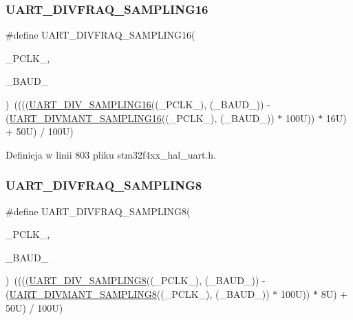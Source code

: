 \subsubsection{\texorpdfstring{U\+A\+R\+T\+\_\+\+D\+I\+V\+F\+R\+A\+Q\+\_\+\+S\+A\+M\+P\+L\+I\+N\+G16}{UART\_DIVFRAQ\_SAMPLING16}}
{\footnotesize\ttfamily \#define U\+A\+R\+T\+\_\+\+D\+I\+V\+F\+R\+A\+Q\+\_\+\+S\+A\+M\+P\+L\+I\+N\+G16(\begin{DoxyParamCaption}\item[{}]{\+\_\+\+P\+C\+L\+K\+\_\+,  }\item[{}]{\+\_\+\+B\+A\+U\+D\+\_\+ }\end{DoxyParamCaption})~((((\hyperlink{group___u_a_r_t___private___macros_gabd6dd99fff6cd5c0374780fd72a61e6e}{U\+A\+R\+T\+\_\+\+D\+I\+V\+\_\+\+S\+A\+M\+P\+L\+I\+N\+G16}((\+\_\+\+P\+C\+L\+K\+\_\+), (\+\_\+\+B\+A\+U\+D\+\_\+)) -\/ (\hyperlink{group___u_a_r_t___private___macros_ga9cd479aff25c454d9d4f3c1c20517c86}{U\+A\+R\+T\+\_\+\+D\+I\+V\+M\+A\+N\+T\+\_\+\+S\+A\+M\+P\+L\+I\+N\+G16}((\+\_\+\+P\+C\+L\+K\+\_\+), (\+\_\+\+B\+A\+U\+D\+\_\+)) $\ast$ 100\+U)) $\ast$ 16\+U) + 50\+U) / 100\+U)}



Definicja w linii 803 pliku stm32f4xx\+\_\+hal\+\_\+uart.\+h.

\mbox{\label{group___u_a_r_t___private___macros_gae0c8a28dbc006a93dd8e90e8ff8a37a0}} 
\subsubsection{\texorpdfstring{U\+A\+R\+T\+\_\+\+D\+I\+V\+F\+R\+A\+Q\+\_\+\+S\+A\+M\+P\+L\+I\+N\+G8}{UART\_DIVFRAQ\_SAMPLING8}}
{\footnotesize\ttfamily \#define U\+A\+R\+T\+\_\+\+D\+I\+V\+F\+R\+A\+Q\+\_\+\+S\+A\+M\+P\+L\+I\+N\+G8(\begin{DoxyParamCaption}\item[{}]{\+\_\+\+P\+C\+L\+K\+\_\+,  }\item[{}]{\+\_\+\+B\+A\+U\+D\+\_\+ }\end{DoxyParamCaption})~((((\hyperlink{group___u_a_r_t___private___macros_ga97075bc06a62c182b0b9a00bbf04b170}{U\+A\+R\+T\+\_\+\+D\+I\+V\+\_\+\+S\+A\+M\+P\+L\+I\+N\+G8}((\+\_\+\+P\+C\+L\+K\+\_\+), (\+\_\+\+B\+A\+U\+D\+\_\+)) -\/ (\hyperlink{group___u_a_r_t___private___macros_ga3dafeed17fc4cf319b0dd88d7d0fb614}{U\+A\+R\+T\+\_\+\+D\+I\+V\+M\+A\+N\+T\+\_\+\+S\+A\+M\+P\+L\+I\+N\+G8}((\+\_\+\+P\+C\+L\+K\+\_\+), (\+\_\+\+B\+A\+U\+D\+\_\+)) $\ast$ 100\+U)) $\ast$ 8\+U) + 50\+U) / 100\+U)}



